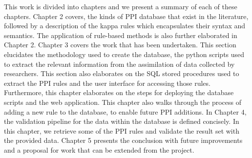 \documentclass[msc,deptreport,ai]{infthesis}      %
\begin{document}
This work is divided into chapters and we present a summary of each of these chapters. Chapter 2 covers, the kinds of PPI database that exist in the literature, followed by a description of the kappa rules which encapsulates their syntax and semantics. The application of rule-based methods is also further elaborated in Chapter 2. Chapter 3 covers the work that has been undertaken. This section elucidates the methodology used to create the database, the python scripts used to extract the relevant information from the assimilation of data collected by researchers. This section also elaborates on the SQL stored procedures used to extract the PPI rules and the user interface for accessing those rules. Furthermore, this chapter elaborates on the steps for deploying the database scripts and the web application. This chapter also walks through the process of adding a new rule to the database, to enable future PPI additions. In Chapter 4, the validation pipeline for the data within the database is defined concisely. In this chapter, we retrieve some of the PPI rules and validate the result set with the provided data. Chapter 5 presents the conclusion with future improvements and a proposal for work that can be extended from the project.


\end{document}
